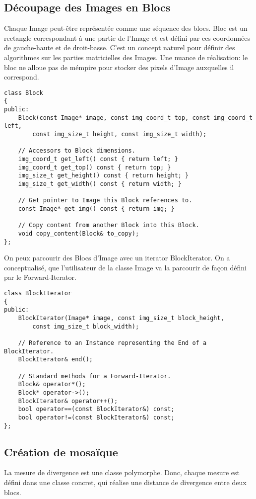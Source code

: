 \documentclass[a4paper]{article}
\begin{document}
\subsection{D\'ecoupage des Images en Blocs}
Chaque Image peut-\^etre repr\'esent\'ee comme une s\'equence des blocs.
Bloc est un rectangle correspondant \`a une partie de l'Image et est d\'efini par ces coordonn\'ees de gauche-haute et de droit-basse.
C'est un concept naturel pour d\'efinir des algorithmes sur les parties matricielles des Images.
Une nuance de r\'ealisation: le bloc ne alloue pas de m\'empire pour stocker des pixels d'Image auxquelles il correspond.

\begin{lstlisting}
class Block
{
public:
	Block(const Image* image, const img_coord_t top, const img_coord_t left,
		const img_size_t height, const img_size_t width);
		
	// Accessors to Block dimensions.
	img_coord_t get_left() const { return left; }
	img_coord_t get_top() const { return top; }
	img_size_t get_height() const { return height; }
	img_size_t get_width() const { return width; }
	
	// Get pointer to Image this Block references to.
	const Image* get_img() const { return img; }
	
	// Copy content from another Block into this Block.
	void copy_content(Block& to_copy);
};
\end{lstlisting}

On peux parcourir des Blocs d'Image avec un iterator BlockIterator.
On a conceptualis\'e, que l'utilisateur de la classe Image va la parcourir de fa\c{c}on d\'efini par le Forward-Iterator.

\begin{lstlisting}
class BlockIterator
{
public:
	BlockIterator(Image* image, const img_size_t block_height,
		const img_size_t block_width);

	// Reference to an Instance representing the End of a BlockIterator.	
	BlockIterator& end();

	// Standard methods for a Forward-Iterator.
	Block& operator*();
	Block* operator->();
	BlockIterator& operator++();
	bool operator==(const BlockIterator&) const;
	bool operator!=(const BlockIterator&) const;
};
\end{lstlisting}

\subsection{Cr\'eation de mosa\"ique}
La mesure de divergence est une classe polymorphe.
Donc, chaque mesure est d\'efini dans une classe concret, qui r\'ealise une distance de divergence entre deux blocs.
\end{document}
